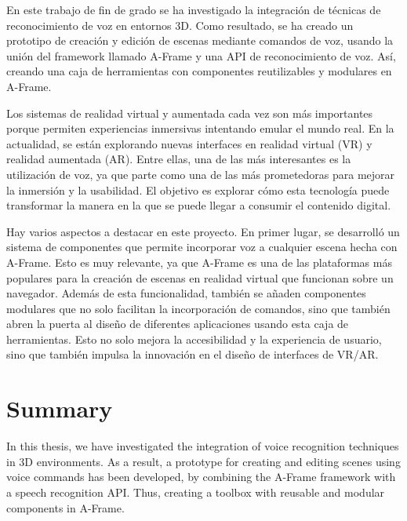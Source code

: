 \documentclass[a4paper, 12pt]{book}
\begin{document}
En este trabajo de fin de grado se ha investigado la integración de técnicas de reconocimiento de voz en entornos 3D.
Como resultado, se ha creado un prototipo de creación y edición de escenas mediante comandos de voz, usando la unión del framework llamado A-Frame y una API de reconocimiento de voz. 
Así, creando una caja de herramientas con componentes reutilizables y modulares en A-Frame.

Los sistemas de realidad virtual y aumentada cada vez son más importantes porque permiten experiencias inmersivas intentando emular el mundo real.
En la actualidad, se están explorando nuevas interfaces en realidad virtual (VR) y realidad aumentada (AR). Entre ellas, una de las más interesantes es la utilización de voz, ya que parte como una de las más prometedoras para mejorar la inmersión y la usabilidad.
El objetivo es explorar cómo esta tecnología puede transformar la manera en la que se puede llegar a consumir el contenido digital.

Hay varios aspectos a destacar en este proyecto.
En primer lugar, se desarrolló un sistema de componentes que permite incorporar voz a cualquier escena hecha con A-Frame.
Esto es muy relevante, ya que A-Frame es una de las plataformas más populares para la creación de escenas en realidad virtual que funcionan sobre un navegador.
Además de esta funcionalidad, también se añaden componentes modulares que no solo facilitan la incorporación de comandos, sino que también abren la puerta al diseño de diferentes aplicaciones usando esta caja de herramientas.
Esto no solo mejora la accesibilidad y la experiencia de usuario, sino que también impulsa la innovación en el diseño de interfaces de VR/AR.


\chapter*{Summary}

In this thesis, we have investigated the integration of voice recognition techniques in 3D environments.
As a result, a prototype for creating and editing scenes using voice commands has been developed, by combining the A-Frame framework with a speech recognition API.
Thus, creating a toolbox with reusable and modular components in A-Frame.
\end{document}
